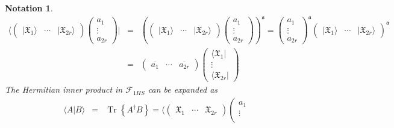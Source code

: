 \documentclass[aps, preprint]{revtex4}
\newtheorem{notation}[theorem]{Notation}
\begin{document}
\begin{notation}
\begin{align} \langle \left (\begin{array}{ccc}\vert \mathfrak{X}_{1} \rangle  & \cdots  & \vert \mathfrak{X}_{2 r} \rangle \end{array}\right ) \left (\begin{array}{c}a_{1} \\
\vdots  \\
a_{2 r}\end{array}\right )\vert  &  = & \left (\left (\begin{array}{ccc}\vert \mathfrak{X}_{1} \rangle  & \cdots  & \vert \mathfrak{X}_{2 r} \rangle \end{array}\right ) \left (\begin{array}{c}a_{1} \\
\vdots  \\
a_{2 r}\end{array}\right )\right )^{\mathfrak{a}} =\left (\begin{array}{c}a_{1} \\
\vdots  \\
a_{2 r}\end{array}\right )^{\mathfrak{a}} \left (\begin{array}{ccc}\vert \mathfrak{X}_{1} \rangle  & \cdots  & \vert \mathfrak{X}_{2 r} \rangle \end{array}\right )^{\mathfrak{a}} \\
 &  = & \left (\begin{array}{ccc}\overline{a_{1}} & \cdots  & \overline{a_{2 r}}\end{array}\right ) \left (\begin{array}{c} \langle \mathfrak{X}_{1}\vert  \\
\vdots  \\
 \langle \mathfrak{X}_{2 r}\vert \end{array}\right )\end{align}The Hermitian inner product in $\mathcal{F}_{1 H S}$ can be expanded as
\begin{align} \langle \left .A\right \vert B \rangle  &  = & \ensuremath{\operatorname*{Tr}} \left \{A^{ \dag } B\right \} = \langle \left .\left (\begin{array}{ccc}\mathfrak{X}_{1} & \cdots  & \mathfrak{X}_{2 r}\end{array}\right ) \left (\begin{array}{c}a_{1} \\
\vdots  \\

\end{array}
\end{align}
\end{notation}
\end{document}
